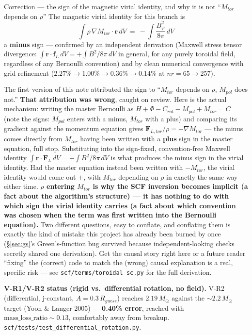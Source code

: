 \documentclass[11pt,a4paper]{scrartcl}
\newcommand{\code}[1]{\texttt{\small #1}}
\begin{document}
\begin{notebox}{Correction --- the sign of the magnetic virial identity, and why it is not ``$M_{tor}$ depends on $\rho$''}
The magnetic virial identity for this branch is
\begin{equation}
\int \rho\,\nabla M_{tor}\cdot\mathbf{r}\,dV \ =\ -\int \frac{B_\varphi^2}{8\pi}\,dV
\end{equation}
a \textbf{minus} sign --- confirmed by an independent derivation (Maxwell
stress tensor divergence: $\int\mathbf{r}\cdot\mathbf{f}_L\,dV=+\int
B^2/8\pi\,dV$ in general, for any purely toroidal field, regardless of
any Bernoulli convention) and by clean numerical convergence with grid
refinement ($2.27\%\to1.00\%\to0.36\%\to0.14\%$ at $nr=65\to257$).

The first version of this note attributed the sign to ``$M_{tor}$ depends
on $\rho$, $M_{pol}$ does not.'' \textbf{That attribution was wrong},
caught on review. Here is the actual mechanism: writing the master
Bernoulli as $H+\Phi-C_{rot}-M_{pol}+M_{tor}=C$ (note the signs: $M_{pol}$
enters with a minus, $M_{tor}$ with a plus) and comparing its gradient
against the momentum equation gives $\mathbf{F}_{L,tor}/\rho=
-\nabla M_{tor}$ --- the minus comes directly from $M_{tor}$ having been
written with a \textbf{plus} sign in the master equation, full stop.
Substituting into the sign-fixed, convention-free Maxwell identity
$\int\mathbf{r}\cdot\mathbf{F}_L\,dV=+\int B^2/8\pi\,dV$ is what produces
the minus sign in the virial identity. Had the master equation instead
been written with $-M_{tor}$, the virial identity would come out $+$,
with $M_{tor}$ depending on $\rho$ in exactly the same way either time.
\textbf{$\rho$ entering $M_{tor}$ is why the SCF inversion becomes
implicit (a fact about the algorithm's structure) --- it has nothing to
do with which sign the virial identity carries (a fact about which
convention was chosen when the term was first written into the Bernoulli
equation).} Two different questions, easy to conflate, and conflating
them is exactly the kind of mistake this project has already been burned
by once (\S\ref{sec:gs}'s Green's-function bug survived because
independent-looking checks secretly shared one derivation). Get the
causal story right here or a future reader ``fixing'' the (correct) code
to match the (wrong) causal explanation is a real, specific risk --- see
\code{scf/terms/toroidal\_sc.py} for the full derivation.
\end{notebox}

\textbf{V-R1/V-R2 status (rigid vs.\ differential rotation, no field).}
V-R2 (differential, j-constant, $A=0.3\,R_{guess}$) reaches
$2.19\,M_\odot$ against the $\sim2.2\,M_\odot$ target (Yoon \& Langer
2005) --- \textbf{0.40\% error}, reached with
$\mathrm{mass\_loss\_ratio}\sim0.13$, comfortably away from breakup.
\code{scf/tests/test\_differential\_rotation.py}.
\end{document}

